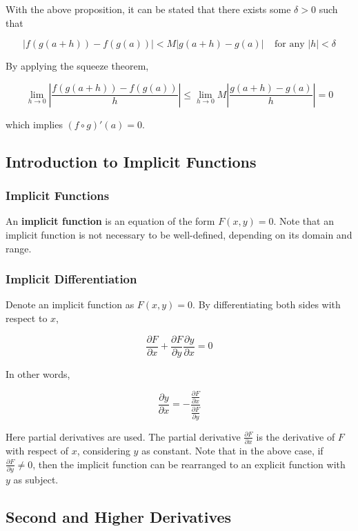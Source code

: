 \documentclass[a4paper,12pt]{article}
\begin{document}
With the above proposition, it can be stated that there exists some $\delta>0$ such that

$$\left| f(g(a+h))-f(g(a))\right| <M\left| g(a+h)-g(a)\right| \;\;\;\;\text{for any }\left| h\right| <\delta$$\s

By applying the squeeze theorem,

$$\lim_{h\to 0}\left| \frac{f(g(a+h))-f(g(a))}{h}\right| \leq\lim_{h\to 0}M\left| \frac{g(a+h)-g(a)}{h}\right| =0$$\s

which implies $(f\circ g)'(a)=0$.

\subsection{Introduction to Implicit Functions}
\subsubsection{Implicit Functions}
\begin{dft}
  An \textbf{implicit function} is an equation of the form $F(x,y)=0$. Note that an implicit function is not necessary to be well-defined, depending on its domain and range.
\end{dft}

\subsubsection{Implicit Differentiation}
\begin{dft}
  Denote an implicit function as $F(x,y)=0$. By differentiating both sides with respect to $x$,

  $$\frac{\partial F}{\partial x}+\frac{\partial F}{\partial y}\frac{\partial y}{\partial x}=0$$
\end{dft}\n

In other words,

$$\frac{\partial y}{\partial x}=-\frac{\frac{\partial F}{\partial x}}{\frac{\partial F}{\partial y}}$$\s

Here partial derivatives are used. The partial derivative $\frac{\partial F}{\partial x}$ is the derivative of $F$ with respect of $x$, considering $y$ as constant. Note that in the above case, if $\frac{\partial F}{\partial y}\neq 0$, then the implicit function can be rearranged to an explicit function with $y$ as subject.

\subsection{Second and Higher Derivatives}
\end{document}
